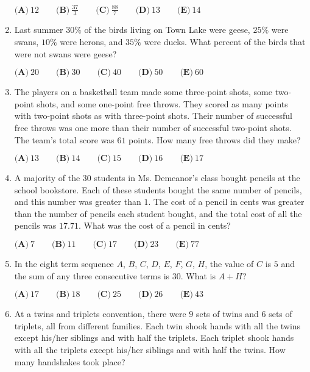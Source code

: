 \documentclass{article}
\begin{document}
\begin{enumerate}[label=\arabic*., itemsep=0.5em]
\(
\textbf{(A)}\ 12 \qquad
\textbf{(B)}\ \frac{37}{3} \qquad
\textbf{(C)}\ \frac{88}{7} \qquad
\textbf{(D)}\ 13 \qquad
\textbf{(E)}\ 14 \)\par \vspace{0.5em}\item Last summer \(30\%\) of the birds living on Town Lake were geese, \(25\%\) were swans, \(10\%\) were herons, and \(35\%\) were ducks. What percent of the birds that were not swans were geese?
 
\(
\textbf{(A)}\ 20 \qquad
\textbf{(B)}\ 30 \qquad
\textbf{(C)}\ 40 \qquad
\textbf{(D)}\ 50 \qquad
\textbf{(E)}\ 60\)\par \vspace{0.5em}\item The players on a basketball team made some three-point shots, some two-point shots, and some one-point free throws. They scored as many points with two-point shots as with three-point shots. Their number of successful free throws was one more than their number of successful two-point shots. The team's total score was \(61\) points. How many free throws did they make?
 
\(
\textbf{(A)}\ 13 \qquad
\textbf{(B)}\ 14 \qquad
\textbf{(C)}\ 15 \qquad
\textbf{(D)}\ 16 \qquad
\textbf{(E)}\ 17 \)\par \vspace{0.5em}\item A majority of the \(30\) students in Ms. Demeanor's class bought pencils at the school bookstore. Each of these students bought the same number of pencils, and this number was greater than \(1\). The cost of a pencil in cents was greater than the number of pencils each student bought, and the total cost of all the pencils was \(17.71\). What was the cost of a pencil in cents?

\(
\textbf{(A)}\ 7 \qquad
\textbf{(B)}\ 11 \qquad
\textbf{(C)}\ 17 \qquad
\textbf{(D)}\ 23 \qquad
\textbf{(E)}\ 77 \)\par \vspace{0.5em}\item In the eight term sequence \(A\), \(B\), \(C\), \(D\), \(E\), \(F\), \(G\), \(H\), the value of \(C\) is \(5\) and the sum of any three consecutive terms is \(30\). What is \(A+H\)?

\(
\textbf{(A)}\ 17 \qquad
\textbf{(B)}\ 18 \qquad
\textbf{(C)}\ 25 \qquad
\textbf{(D)}\ 26 \qquad
\textbf{(E)}\ 43 \)\par \vspace{0.5em}\item At a twins and triplets convention, there were \(9\) sets of twins and \(6\) sets of triplets, all from different families. Each twin shook hands with all the twins except his/her siblings and with half the triplets. Each triplet shook hands with all the triplets except his/her siblings and with half the twins. How many handshakes took place?


\end{enumerate}
\end{document}
